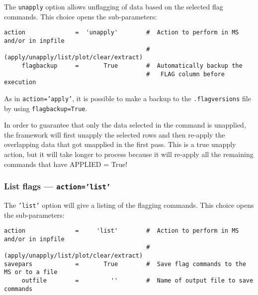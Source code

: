 The {\tt unapply} option allows unflagging of data based on the selected flag commands.
This choice opens the sub-parameters:
\small
\begin{verbatim}
action              =  'unapply'        #  Action to perform in MS and/or in inpfile
                                        #   (apply/unapply/list/plot/clear/extract)
     flagbackup     =       True        #  Automatically backup the
                                        #   FLAG column before execution

\end{verbatim}
\normalsize

As in {\tt action='apply'}, it is possible to make a backup to the
{\tt *.flagversions} file by using {\tt flagbackup=True}.  

In order to guarantee that only the data selected in the command is
unapplied, the framework will first unapply the selected rows and then
re-apply the overlapping data that got unapplied in the first
pass. This is a true unapply action, but it will take longer to
process because it will re-apply all the remaining commands that have
APPLIED = True!


%



\subsubsection{List flags --- {\tt action='list'}}
\label{section:edit.flagcmd.action.list}

The {\tt 'list'} option will give a listing of the flagging commands.
This choice opens the sub-parameters:
\small
\begin{verbatim}
action              =     'list'        #  Action to perform in MS and/or in inpfile
                                        # (apply/unapply/list/plot/clear/extract)
savepars            =       True        #  Save flag commands to the MS or to a file
     outfile        =         ''        #  Name of output file to save commands
\end{verbatim}
\normalsize

